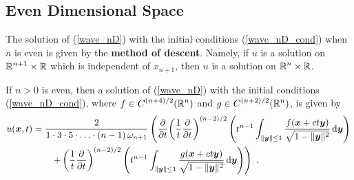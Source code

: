 \subsection{Even Dimensional Space}

The solution of (\ref{wave_nD}) with the initial conditions
(\ref{wave_nD_cond}) when $n$ is even is given by the
{\bfseries method of descent}.
Namely, if $u$ is a solution on
$\DS \RR^{n+1}\times \RR$ which is independent of
$x_{n+1}$, then $u$ is a solution on $\DS \RR^n\times \RR$.

\begin{theorem} \label{wave_sol_nD_even}
If $n >0$ is even, then a solution of
(\ref{wave_nD}) with the initial conditions (\ref{wave_nD_cond}), where
$\DS f\in C^{(n+4)/2}(\RR^n)$ and
$\DS g\in C^{(n+2)/2}(\RR^n)$, is given by
\begin{align}
u(\VEC{x},t) &= \frac{2}{1\cdot 3 \cdot 5 \cdot \ldots \cdot (n-1)
\,\omega_{n+1}}
\left( \pdfdx{ \left( \frac{1}{t} \pdydx{}{t} \right)^{(n-2)/2} }{t}
\left( t^{n-1} \int_{\|\VEC{y}\|\leq 1}
\frac{f(\VEC{x} + ct \VEC{y})}{\sqrt{1-\|\VEC{y}\|^2}} \dx{\VEC{y}}
\right)  \right. \nonumber \\
&\qquad \left. + \left( \frac{1}{t} \pdydx{}{t} \right)^{(n-2)/2}
\left( t^{n-1} \int_{\|\VEC{y}\|\leq 1}
\frac{g(\VEC{x}+ ct\VEC{y})}{\sqrt{1-\|\VEC{y}\|^2}} \dx{\VEC{y}}
\right) \right) \ .  \label{wave_sol_nD_evenEQ}
\end{align}
\end{theorem}

